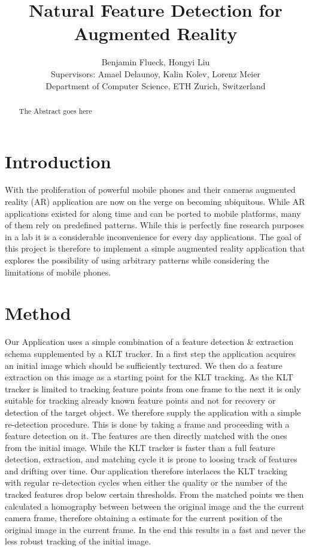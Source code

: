 \documentclass[10pt,conference,compsocconf]{IEEEtran}
\begin{document}
\title{Natural Feature Detection for Augmented Reality}

\author{
  Benjamin Flueck, Hongyi Liu\\
  Supervisors: Amael Delaunoy, Kalin Kolev, Lorenz Meier\\
  Department of Computer Science, ETH Zurich, Switzerland\\
}

\maketitle

\begin{abstract}
The Abstract goes here
\end{abstract}

\section{Introduction}

With the proliferation of powerful mobile phones and their cameras augmented reality (AR) application are now on the verge on becoming ubiquitous. While AR applications existed for along time and can be ported to mobile platforms, many of them rely on predefined patterns. While this is perfectly fine research purposes in a lab it is a considerable inconvenience for every day applications. The goal of this project is therefore to implement a simple augmented reality application that explores the possibility of using arbitrary patterns while considering the limitations of mobile phones.

\section{Method}

Our Application uses a simple combination of a feature detection \& extraction schema supplemented by a KLT tracker. In a first step the application acquires an initial image which should be sufficiently textured. We then do a feature extraction on this image as a starting point for the KLT tracking. As the KLT tracker is limited to  tracking feature points from one frame to the next it is only suitable for tracking already known feature points and not for recovery or detection of the target object. We therefore supply the application with a simple re-detection procedure. This is done by taking a frame and proceeding with a feature detection on it. The features are then directly matched with the ones from the initial image. While the KLT tracker is faster than a full feature detection, extraction, and matching cycle it is prone to loosing track of features and drifting over time. Our application therefore interlaces the KLT tracking with regular re-detection cycles when either the quality or the number of the tracked features drop below certain thresholds. From the matched points we then calculated a homography between between the original image and the the current camera frame, therefore obtaining a estimate for the current position of the original image in the current frame.  In the end this results in a fast and never the less robust tracking of the initial image.
\end{document}
